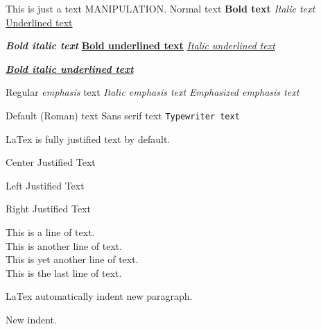 \documentclass[10pt]{article}
\begin{document}
	
	This is just a text {\LARGE MANIPULATION}.
	Normal text
	\textbf{Bold text}
	\textit{Italic text}
	\underline{Underlined text}
	
	\textbf{\textit{Bold italic text}}
	\textbf{\underline{Bold underlined text}}
	\textit{\underline{Italic underlined text}}
	
	\textbf{\textit{\underline{Bold italic underlined text}}}
	
	
	Regular \emph{emphasis} text
	\textit{Italic \emph{emphasis} text}
	\emph{Emphasized \emph{emphasis} text}
	
	\textrm{Default (Roman) text}
	\textsf{Sans serif text}
	\texttt{Typewriter text}
	
	LaTex is fully justified text by default.
	
	\begin{center}
		Center Justified Text
	\end{center}

	\begin{flushleft}
		Left Justified Text
	\end{flushleft}

	\begin{flushright}
		Right Justified Text
	\end{flushright}

	This is a line of text. \\
	This is another line of text. \\[\baselineskip]
	This is yet another line of text. \\[2\baselineskip]
	This is the last line of text.
	
	LaTex automatically indent new paragraph.
	
	\setlength{\parindent}{15pt}
	New indent.
	
\end{document}
